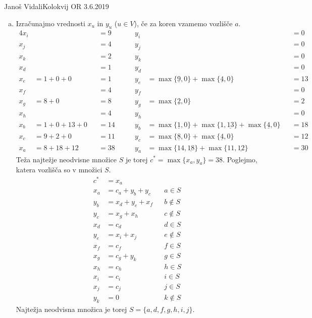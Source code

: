 \begin{naloga}{Janoš Vidali}{Kolokvij OR 3.6.2019}
\begin{odgovor}
\begin{enumerate}[(a)]
\item Izračunajmo vrednosti $x_u$ in $y_u$ ($u \in V$),
če za koren vzamemo vozlišče $a$.
\begin{alignat*}{4}
x_i &&&= 9 &\qquad y_i &&&= 0 \\
x_j &&&= 4 &\qquad y_j &&&= 0 \\
x_k &&&= 2 &\qquad y_k &&&= 0 \\
x_d &&&= 1 &\qquad y_d &&&= 0 \\
x_e &= 1+0+0 &&= 1 &\qquad
y_e &= \max\{\underline{9}, 0\} + \max\{\underline{4}, 0\} &&= 13 \\
x_f &&&= 4 &\qquad y_f &&&= 0 \\
x_g &= 8+0 &&= 8 &\qquad
y_g &= \max\{\underline{2}, 0\} &&= 2 \\
x_h &&&= 4 &\qquad y_h &&&= 0 \\
x_b &= 1+0+13+0 &&= 14 &\qquad y_b &= \max\{\underline{1}, 0\}
+ \max\{1, \underline{13}\} + \max\{\underline{4}, 0\} &&= 18 \\
x_c &= 9+2+0 &&= 11 &\qquad
y_c &= \max\{\underline{8}, 0\} + \max\{\underline{4}, 0\} &&= 12 \\
x_a &= 8+18+12 &&= 38 &\qquad
y_a &= \max\{14, \underline{18}\} + \max\{11, \underline{12}\} &&= 30
\end{alignat*}
Teža najtežje neodvisne množice $S$ je torej $c^* = \max\{x_a, y_a\} = 38$.
Poglejmo, katera vozlišča so v množici $S$.
\begin{align*}
c^* &= x_a \\
x_a &= c_a + y_b + y_c && a \in S \\
y_b &= x_d + y_e + x_f && b \not\in S \\
y_c &= x_g + x_h && c \not\in S \\
x_d &= c_d && d \in S \\
y_e &= x_i + x_j && e \not\in S \\
x_f &= c_f && f \in S \\
x_g &= c_g + y_k && g \in S \\
x_h &= c_h && h \in S \\
x_i &= c_i && i \in S \\
x_j &= c_j && j \in S \\
y_k &= 0 && k \not\in S
\end{align*}
Najtežja neodvisna množica je torej $S = \{a, d, f, g, h, i, j\}$.
\end{enumerate}
\end{odgovor}
\end{naloga}
